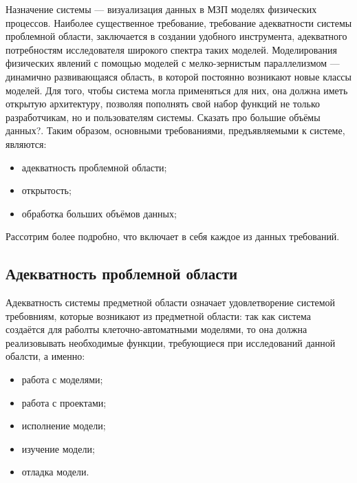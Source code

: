 \documentclass[a4paper,12pt]{extarticle}
\begin{document}
Назначение системы — визуализация данных в МЗП моделях физических процессов.  Наиболее существенное требование, требование адекватности системы проблемной области, заключается в создании удобного инструмента, адекватного потребностям исследователя широкого спектра таких моделей.  Моделирования физических явлений с помощью моделей с мелко-зернистым параллелизмом — динамично развивающаяся область, в которой постоянно возникают новые классы моделей. Для того, чтобы система могла применяться для них, она должна иметь открытую архитектуру, позволяя пополнять свой набор функций не только разработчикам, но и пользователям системы. Сказать про большие объёмы данных?. Таким образом, основными требованиями, предъявляемыми к системе, являются:
\begin{itemize}
    \item адекватность проблемной области;
    \item открытость;
    \item обработка больших объёмов данных;
\end{itemize}

Рассотрим более подробно, что включает в себя каждое из данных требований.

\subsection{Адекватность проблемной области}
\label{sec:requirements-adequacy}

Адекватность системы предметной области означает удовлетворение системой требовниям, которые возникают из предметной области: так как система создаётся для раболты клеточно-автоматными моделями, то она должна реализовывать необходимые функции, требующиеся при исследований данной обалсти, а именно:
\begin{itemize}
    \item работа с моделями;
    \item работа с проектами;
    \item исполнение модели;
    \item изучение модели;
    \item отладка модели.
\end{itemize}
\end{document}
